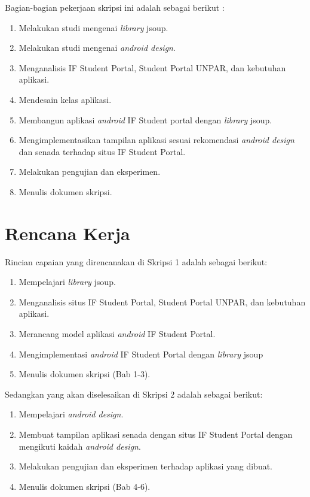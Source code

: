\documentclass[a4paper,twoside]{article}
\begin{document}
Bagian-bagian pekerjaan skripsi ini adalah sebagai berikut :
	\begin{enumerate}
		\item Melakukan studi mengenai \textit{library} jsoup.
		\item Melakukan studi mengenai \textit{android design}.
		\item Menganalisis IF Student Portal, Student Portal UNPAR, dan kebutuhan aplikasi.
		\item Mendesain kelas aplikasi.
		\item Membangun aplikasi \textit{android} IF Student portal dengan \textit{library} jsoup.
		\item Mengimplementasikan tampilan aplikasi sesuai rekomendasi \textit{android design} dan senada terhadap situs IF Student Portal.
		\item Melakukan pengujian dan eksperimen.
		\item Menulis dokumen skripsi.
	\end{enumerate}

\section{Rencana Kerja}
Rincian capaian yang direncanakan di Skripsi 1 adalah sebagai berikut:
\begin{enumerate}
\item Mempelajari \textit{library} jsoup.
\item Menganalisis situs IF Student Portal, Student Portal UNPAR, dan kebutuhan aplikasi.
\item Merancang model aplikasi \textit{android} IF Student Portal.
\item Mengimplementasi \textit{android} IF Student Portal dengan \textit{library} jsoup
\item Menulis dokumen skripsi (Bab 1-3).
\end{enumerate}

Sedangkan yang akan diselesaikan di Skripsi 2 adalah sebagai berikut:
\begin{enumerate}
\item Mempelajari \textit{android design}.
\item Membuat tampilan aplikasi senada dengan situs IF Student Portal dengan mengikuti kaidah \textit{android design}.
\item Melakukan pengujian dan eksperimen terhadap aplikasi yang dibuat.
\item Menulis dokumen skripsi (Bab 4-6).
\end{enumerate}
\end{document}
